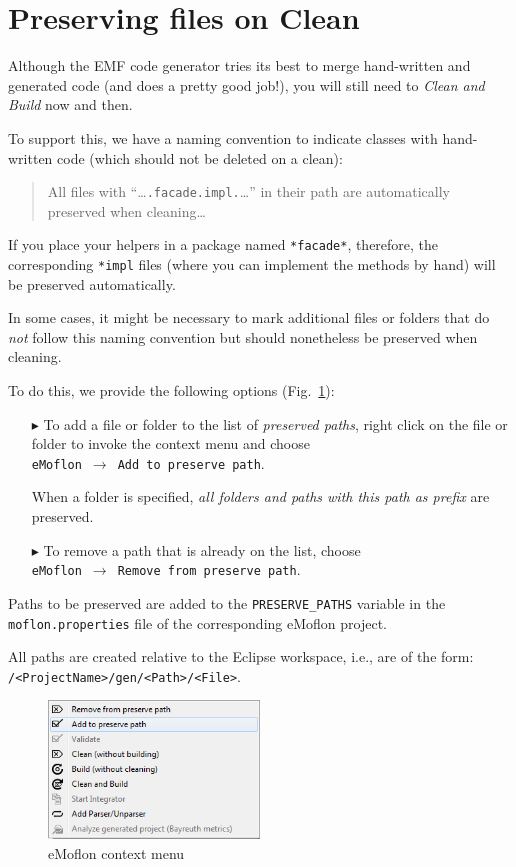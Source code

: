 \clearpage

\section{Preserving files on Clean}

Although the EMF code generator tries its best to merge hand-written and generated code (and does a pretty good job!), you will still need to \emph{Clean and Build} now and then.

To support this, we have a naming convention to indicate classes with hand-written code (which should not be deleted on a clean):
\begin{quote}
All files with ``\ldots \texttt{.facade.impl.}\ldots'' in their path are automatically preserved when cleaning\ldots
\end{quote}

If you place your helpers in a package named \texttt{*facade*}, therefore, the corresponding \texttt{*impl} files (where you can implement the methods by hand) will be preserved automatically.

In some cases, it might be necessary to mark additional files or folders that do \emph{not} follow this naming convention but should nonetheless be preserved when cleaning.

To do this, we provide the following options (Fig.~\ref{fig:preservepath}):
\begin{itemize}
\item [$\blacktriangleright$] To add a file or folder to the list of \emph{preserved paths}, right click on the file or folder to invoke the context menu and choose\\ \mbox{\texttt{eMoflon} $\rightarrow$ \texttt{Add to preserve path}}.

When a folder is specified, \emph{all folders and paths with this path as prefix} are preserved.
\item [$\blacktriangleright$]To remove a path that is already on the list, choose\\ \mbox{\texttt{eMoflon} $\rightarrow$ \texttt{Remove from preserve path}}.
\end{itemize}

Paths to be preserved are added to the \texttt{PRESERVE\_PATHS} variable in the \texttt{moflon.properties} file of the corresponding eMoflon project.

All paths are created relative to the Eclipse workspace, i.e., are of the form: 
\texttt{/<ProjectName>/gen/<Path>/<File>}.
\clearpage

\begin{figure}[htp]
\begin{center}
  \includegraphics[width=0.5\textwidth]{pics/advancedTopics/preservePath/PreservePath}
  \caption{eMoflon context menu}
  \label{fig:preservepath}
\end{center}
\end{figure}
